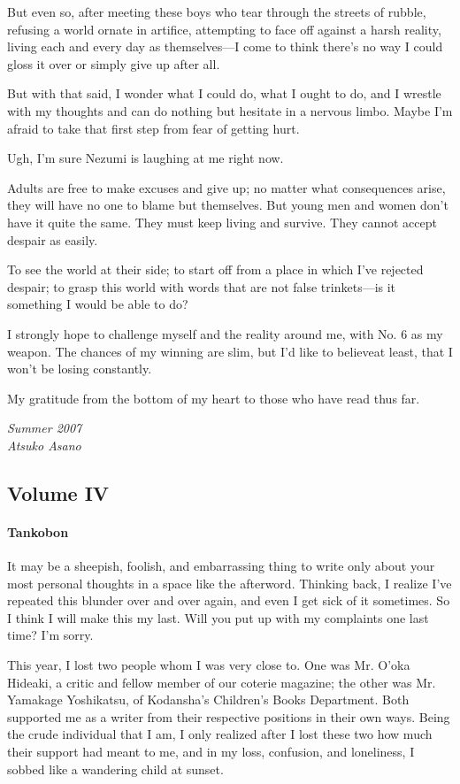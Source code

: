 But even so, after meeting these boys who tear through the streets of
rubble, refusing a world ornate in artifice, attempting to face off
against a harsh reality, living each and every day as themselves---I come
to think there's no way I could gloss it over or simply give up after
all.

But with that said, I wonder what I could do, what I ought to do, and I
wrestle with my thoughts and can do nothing but hesitate in a nervous
limbo. Maybe I'm afraid to take that first step from fear of getting
hurt.

Ugh, I'm sure Nezumi is laughing at me right now.

Adults are free to make excuses and give up; no matter what consequences
arise, they will have no one to blame but themselves. But young men and
women don't have it quite the same. They must keep living and survive.
They cannot accept despair as easily.

To see the world at their side; to start off from a place in which I've
rejected despair; to grasp this world with words that are not false
trinkets---is it something I would be able to do?

I strongly hope to challenge myself and the reality around me, with No.
6 as my weapon. The chances of my winning are slim, but I'd like to
believe\el at least, that I won't be losing constantly.

My gratitude from the bottom of my heart to those who have read thus
far.

\myspace

\emph{Summer 2007\\
	Atsuko Asano}

\subsection{Volume IV}
\paragraph{Tankobon}

It may be a sheepish, foolish, and embarrassing thing to write only
about your most personal thoughts in a space like the afterword.
Thinking back, I realize I've repeated this blunder over and over again,
and even I get sick of it sometimes. So I think I will make this my
last. Will you put up with my complaints one last time? I'm sorry.

This year, I lost two people whom I was very close to. One was Mr. O'oka
Hideaki, a critic and fellow member of our coterie magazine; the other
was Mr. Yamakage Yoshikatsu, of Kodansha's Children's Books Department.
Both supported me as a writer from their respective positions in their
own ways. Being the crude individual that I am, I only realized after I
lost these two how much their support had meant to me, and in my loss,
confusion, and loneliness, I sobbed like a wandering child at sunset.

